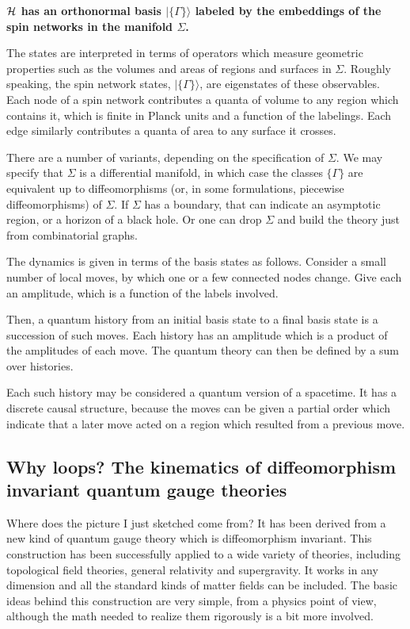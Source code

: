 \documentclass[12pt]{article}
\begin{document}
{\bf $\cal H$ has an orthonormal basis $|\{ \Gamma \} \rangle$ labeled by
the embeddings of the spin networks in the manifold $\Sigma$.}  

The states are interpreted in terms of operators which measure geometric
properties such as  the volumes and areas of regions and surfaces in 
$\Sigma$. Roughly speaking, the spin
network states, $|\{ \Gamma \} \rangle$,  are eigenstates of these observables. 
Each node of a spin network 
contributes a quanta of volume to any region which contains it, which is finite in Planck units and  a function of
the labelings. Each edge similarly contributes a quanta of area to any surface
it crosses. 

There are a number of variants, depending on the specification of 
$\Sigma$. We may specify that $\Sigma$ is a differential manifold, in which
case the classes $\{ \Gamma \} $ are equivalent up to diffeomorphisms
(or, in some formulations, piecewise diffeomorphisms) of $\Sigma$.  
If $\Sigma$ has a boundary, that can indicate an asymptotic region, 
or a horizon of a black hole. 
Or
one can drop $\Sigma$  and build
the theory just from combinatorial graphs. 

The dynamics is given in terms of the basis states as follows.
Consider a small number of local moves, by which one or a few connected nodes change. Give
each an amplitude, which is a function of the labels involved. 

Then, a quantum history from an initial basis state to a final basis state
is a succession of such moves.  Each history has an amplitude which is a product
of the amplitudes of each move.  The quantum theory can then be defined
by a sum over histories. 

Each such history may be considered a quantum version of a spacetime.
It has a discrete causal structure, because the moves can be given 
a partial order which indicate that a later move acted on a region which
resulted from a previous move.  




\subsection{Why loops?  The kinematics of diffeomorphism invariant quantum gauge theories}

Where does the picture I just sketched come from?  It has been derived from 
 a new kind 
of quantum gauge theory which is diffeomorphism invariant.  
This construction has been successfully applied to a wide variety of theories, including 
topological field theories, general relativity and 
supergravity. It works in any dimension and all the standard kinds of
matter fields can be included.   The basic 
ideas behind this construction are very simple, from a physics point 
of view, although the math needed to realize them rigorously is a bit 
more involved. 
\end{document}
